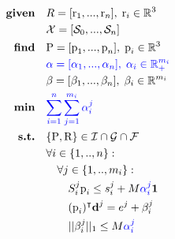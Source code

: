 \begin{align}
    \textrm{\textbf{given}} %
                            \quad & R=[\mbox{r}_1,...,\mbox{r}_n], \; \mbox{r}_i \in \mathbb{R}^{3} \nonumber\\
                            \quad & \mathcal{X}=[\mathcal{S}_0, ..., \mathcal{S}_n] \nonumber\\
    \textrm{\textbf{find}}  \quad & \mbox{P}=[\mbox{p}_1,...,\mbox{p}_n], \;\mbox{p}_i \in \mathbb{R}^{3} \nonumber\\
                            \quad & \textcolor{blue}{\alpha=[\alpha_1,...,\alpha_n], \; \alpha_i \in \mathbb{R}_{+}^{m_i}} \label{eq:mbc:sl1m:slack_relaxed}\\
                            \quad & \beta=[\beta_1,...,\beta_n], \; \beta_i \in \mathbb{R}^{m_i} \nonumber\\
    \textrm{\textbf{min}}  \quad & \textcolor{blue}{\sum_{i=1}^{n} \sum_{j=1}^{m_i} \alpha_i^j} \label{eq:mbc:sl1m:norm_l1}\\
    \textrm{\textbf{s.t.}}  \quad & \{\mbox{P},\mbox{R}\} \in \mathcal{I} \cap \mathcal{G} \cap \mathcal{F} \nonumber\\
                            \quad & \forall i \in \{1,..,n\} : \nonumber\\
                                \quad & \quad \forall j \in \{1,..,m_i\} : \nonumber\\
                                    \quad & \quad \quad S_i^j\mbox{p}_i \leq s_i^j + M \textcolor{blue}{\alpha_i^j} \textbf{1} \nonumber\\
                                    \quad & \quad \quad (\mbox{p}_i)^{\intercal} \textbf{d}^j = e^j + \beta_i^j \nonumber\\
                                    \quad & \quad \quad ||\beta_i^j||_1 \leq M \textcolor{blue}{\alpha_i^j} \nonumber\\
                                    \nonumber
\end{align}
